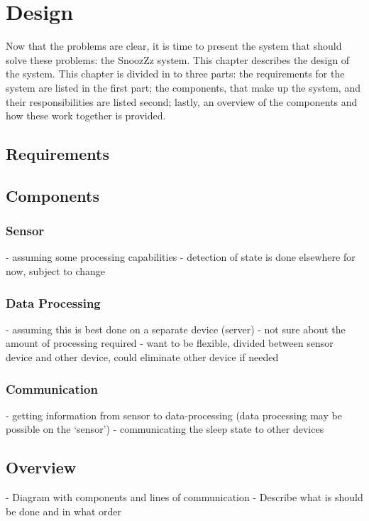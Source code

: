 \chapter{Design} %
\label{cha:design}
Now that the problems are clear, it is time to present the system that should solve these problems: the SnoozZz system. This chapter describes the design of the system. This chapter is divided in to three parts: the requirements for the system are listed in the first part; the components, that make up the system, and their responsibilities are listed second; lastly, an overview of the components and how these work together is provided.

\section{Requirements} %
\label{sec:requirements}


\section{Components} %
\label{sec:components}

\subsection{Sensor} %
\label{sub:sensor}
- assuming some processing capabilities
- detection of state is done elsewhere for now, subject to change

\subsection{Data Processing} %
\label{sub:data_processing}
- assuming this is best done on a separate device (server)
- not sure about the amount of processing required
- want to be flexible, divided between sensor device and other device, could eliminate other device if needed

\subsection{Communication} %
\label{sub:communication}
- getting information from sensor to data-processing (data processing may be possible on the `sensor')
- communicating the sleep state to other devices


\section{Overview} %
\label{sec:overview}
- Diagram with components and lines of communication
- Describe what is should be done and in what order

